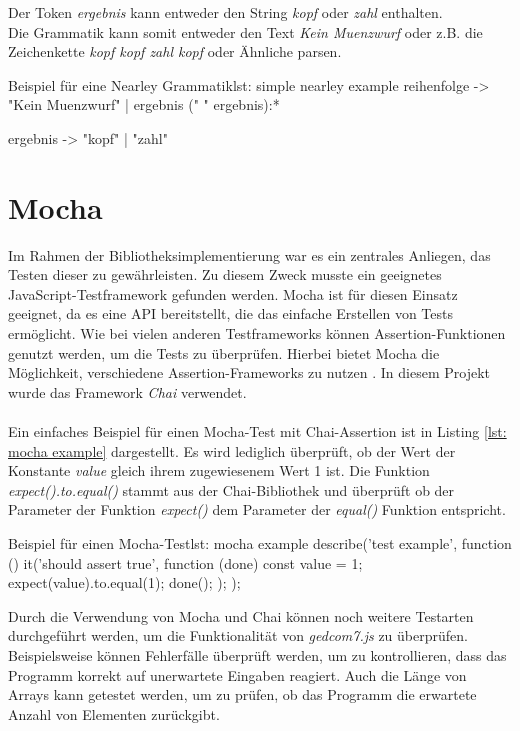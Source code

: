 Der Token \textit{ergebnis} kann entweder den String \textit{kopf} oder \textit{zahl} enthalten.\\
Die Grammatik kann somit entweder den Text \textit{Kein Muenzwurf} oder z.B. die Zeichenkette \textit{kopf kopf zahl kopf} oder Ähnliche parsen.

{\begin{javascript}{Beispiel für eine Nearley Grammatik}{lst: simple nearley example}
	reihenfolge 
	 -> "Kein Muenzwurf" 
		| ergebnis (" " ergebnis):*
	
	ergebnis 
	 -> "kopf"
		| "zahl"
\end{javascript}}



\section{Mocha}
\label{sec: Mocha}

Im Rahmen der Bibliotheksimplementierung war es ein zentrales Anliegen, das Testen dieser zu gewährleisten.
Zu diesem Zweck musste ein geeignetes JavaScript-Testframework gefunden werden. Mocha ist für diesen Einsatz geeignet, da es eine API bereitstellt, 
die das einfache Erstellen von Tests ermöglicht. Wie bei vielen anderen Testframeworks können Assertion-Funktionen genutzt werden, um die Tests zu überprüfen. 
Hierbei bietet Mocha die Möglichkeit, verschiedene Assertion-Frameworks zu nutzen \cite{MochaDoc}. In diesem Projekt wurde das Framework \textit{Chai} verwendet. 
\\ \\
Ein einfaches Beispiel für einen Mocha-Test mit Chai-Assertion ist in Listing \ref{lst: mocha example} dargestellt. Es wird lediglich überprüft, ob der Wert der Konstante
\textit{value} gleich ihrem zugewiesenem Wert 1 ist.
Die Funktion \textit{expect().to.equal()} stammt aus der Chai-Bibliothek und überprüft ob der Parameter der Funktion \textit{expect()} dem Parameter der \textit{equal()} Funktion entspricht.
\newpage
\begin{javascript}{Beispiel für einen Mocha-Test}{lst: mocha example}
	describe('test example', function () {
		it('should assert true', function (done) {
			const value = 1;
			expect(value).to.equal(1);
			done();
		});
	});
\end{javascript}
\vspace{1em}
Durch die Verwendung von Mocha und Chai können noch weitere Testarten durchgeführt werden, um die Funktionalität 
von \textit{gedcom7.js} zu überprüfen. Beispielsweise können Fehlerfälle überprüft werden, um zu kontrollieren, 
dass das Programm korrekt auf unerwartete Eingaben reagiert. Auch die Länge von Arrays kann getestet werden, 
um zu prüfen, ob das Programm die erwartete Anzahl von Elementen zurückgibt.

